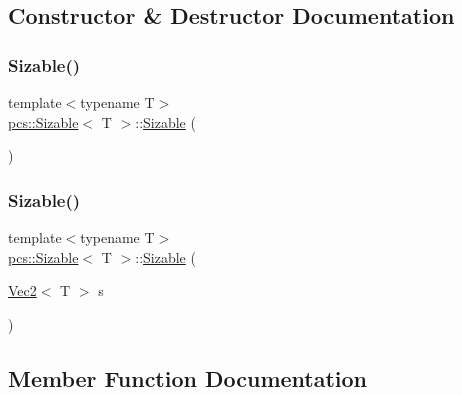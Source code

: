 \subsection{Constructor \& Destructor Documentation}
\mbox{\label{structpcs_1_1Sizable_a3d9a35994cf6cca4780b71696f272478}} 
\subsubsection{\texorpdfstring{Sizable()}{Sizable()}\hspace{0.1cm}{\footnotesize\ttfamily [1/2]}}
{\footnotesize\ttfamily template$<$typename T$>$ \\
\hyperlink{structpcs_1_1Sizable}{pcs\+::\+Sizable}$<$ T $>$\+::\hyperlink{structpcs_1_1Sizable}{Sizable} (\begin{DoxyParamCaption}{ }\end{DoxyParamCaption})\hspace{0.3cm}{\ttfamily [inline]}}

\mbox{\label{structpcs_1_1Sizable_a055bb2c5e72647cbbd08ff4499220b1f}} 
\subsubsection{\texorpdfstring{Sizable()}{Sizable()}\hspace{0.1cm}{\footnotesize\ttfamily [2/2]}}
{\footnotesize\ttfamily template$<$typename T$>$ \\
\hyperlink{structpcs_1_1Sizable}{pcs\+::\+Sizable}$<$ T $>$\+::\hyperlink{structpcs_1_1Sizable}{Sizable} (\begin{DoxyParamCaption}\item[{\hyperlink{structpcs_1_1Vec2}{Vec2}$<$ T $>$}]{s }\end{DoxyParamCaption})\hspace{0.3cm}{\ttfamily [inline]}}



\subsection{Member Function Documentation}
\mbox{\label{structpcs_1_1Sizable_a25a557b9cef6256101642913866c1a3f}} 
